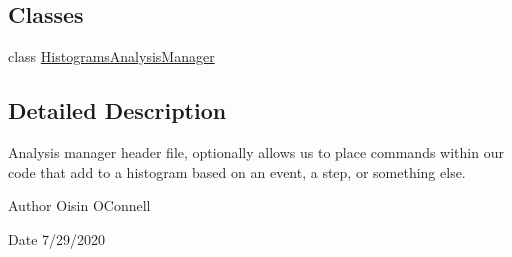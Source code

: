 \subsection*{Classes}
\begin{DoxyCompactItemize}
\item 
class \hyperlink{classHistogramsAnalysisManager}{Histograms\+Analysis\+Manager}
\end{DoxyCompactItemize}


\subsection{Detailed Description}
Analysis manager header file, optionally allows us to place commands within our code that add to a histogram based on an event, a step, or something else. 

\begin{DoxyAuthor}{Author}
Oisin O\textquotesingle{}Connell 
\end{DoxyAuthor}
\begin{DoxyDate}{Date}
7/29/2020 
\end{DoxyDate}
